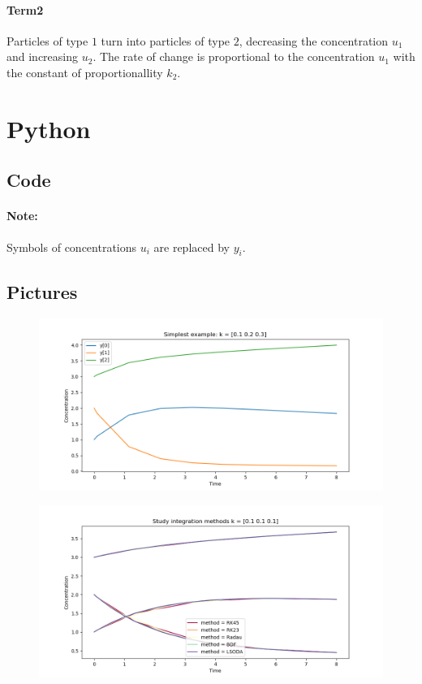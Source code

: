 \documentclass[10pt,a4paper]{article}
\begin{document}
\paragraph*{Term2}
Particles of type $1$ turn into particles of type $2$,
decreasing the concentration $u_1$ and increasing $u_2$.
The rate of change is proportional to the concentration $u_1$ with the
constant of proportionallity $k_2$.

\section{Python}

\subsection{Code}

\paragraph{Note:}
Symbols of concentrations $u_i$ are replaced by $y_i$.



\subsection{Pictures}

\begin{figure}[!h]
\centering
\includegraphics[width=\textwidth]{../01_reactionKinetics/simple}
\end{figure}

\begin{figure}[!h]
\centering
\includegraphics[width=\textwidth]{../01_reactionKinetics/influence_method}
\end{figure}
\end{document}
